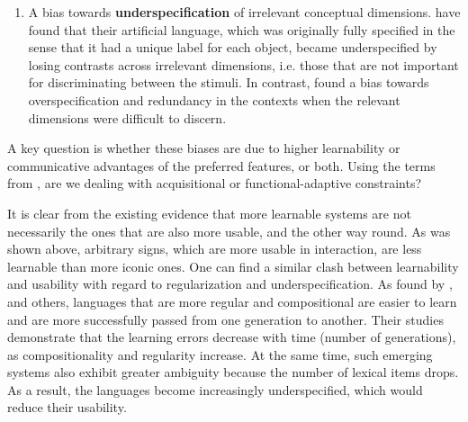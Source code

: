 \documentclass[output=paper]{langsci/langscibook}
\begin{document}
\begin{enumerate}
\item 
A bias towards \textbf{underspecification} of irrelevant conceptual dimensions. \citet{SilveyEtAl2015} have found that their artificial language, which was originally fully specified in the sense that it had a unique label for each object, became underspecified by losing contrasts across irrelevant dimensions, i.e. those that are not important for discriminating between the stimuli. In contrast, \citet{TinitsEtAl2017} found a bias towards overspecification and redundancy in the contexts when the relevant dimensions were difficult to discern.  
\end{enumerate}

A key question is whether these biases are due to higher learnability or communicative advantages of the preferred features, or both. Using the terms from , are we dealing with acquisitional or functional-adaptive constraints? 

It is clear from the existing evidence that more learnable systems are not necessarily the ones that are also more usable, and the other way round. As was shown above, arbitrary signs, which are more usable in interaction, are less learnable than more iconic ones. One can find a similar clash between learnability and usability with regard to regularization and underspecification. As found by \citet{KirbyEtAl2008}, \citet{Verhoef2012} and others, languages that are more regular and compositional are easier to learn and are more successfully passed from one generation to another. Their studies demonstrate that the learning errors decrease with time (number of generations), as compositionality and regularity increase. At the same time, such emerging systems also exhibit greater ambiguity because the number of lexical items drops. As a result, the languages become increasingly underspecified, which would reduce their usability. 
\end{document}
